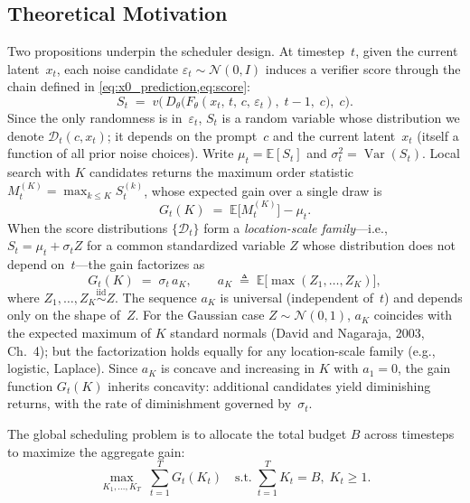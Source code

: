 \subsection{Theoretical Motivation}
\label{sec:theory}

Two propositions underpin the scheduler design.
At timestep~$t$, given the current latent~$x_t$, each noise candidate
$\varepsilon_t\sim\mathcal{N}(0,I)$ induces a verifier score through the
chain defined in \cref{eq:x0_prediction,eq:score}:
\begin{equation}
  S_t \;=\; v\!\bigl(\,D_\theta\bigl(F_\theta(x_t,\,t,\,c,\,\varepsilon_t),
  \;t\!-\!1,\;c\bigr),\;c\bigr).
  \label{eq:score_rv}
\end{equation}
Since the only randomness is in~$\varepsilon_t$, $S_t$ is a random variable
whose distribution we denote $\mathcal{D}_t(c,x_t)$; it depends on the
prompt~$c$ and the current latent~$x_t$ (itself a function of all prior
noise choices).
Write $\mu_t=\mathbb{E}[S_t]$ and $\sigma_t^2=\operatorname{Var}(S_t)$.
Local search with $K$ candidates returns the maximum order statistic
$M_t^{(K)}=\max_{k\le K}S_t^{(k)}$, whose expected gain over a single draw
is
\begin{equation}
  G_t(K) \;=\; \mathbb{E}\!\bigl[M_t^{(K)}\bigr] - \mu_t.
  \label{eq:gain}
\end{equation}
When the score distributions $\{\mathcal{D}_t\}$ form a
\emph{location-scale family}---i.e.,
$S_t = \mu_t + \sigma_t Z$ for a common standardized variable $Z$
whose distribution does not depend on~$t$---the gain factorizes as
\begin{equation}
  G_t(K) \;=\; \sigma_t\,a_K,
  \qquad
  a_K \;\triangleq\; \mathbb{E}\bigl[\max(Z_1,\dots,Z_K)\bigr],
  \label{eq:gain-factor}
\end{equation}
where $Z_1,\dots,Z_K\stackrel{\text{iid}}{\sim}Z$.
The sequence $a_K$ is universal (independent of~$t$) and depends only
on the shape of~$Z$.
For the Gaussian case $Z\sim\mathcal{N}(0,1)$, $a_K$ coincides with
the expected maximum of $K$ standard normals (David and Nagaraja, 2003,
Ch.~4); but the factorization holds equally for any location-scale
family (e.g., logistic, Laplace).
Since $a_K$ is concave and increasing in $K$ with $a_1=0$, the gain function
$G_t(K)$ inherits concavity: additional candidates yield diminishing
returns, with the rate of diminishment governed by~$\sigma_t$.

The global scheduling problem is to allocate the total budget $B$ across
timesteps to maximize the aggregate gain:
\begin{equation}
  \max_{K_1,\dots,K_T}\;\sum_{t=1}^{T}G_t(K_t)
  \quad\text{s.t.}\;\sum_{t=1}^{T}K_t=B,\;K_t\ge 1.
  \label{eq:alloc}
\end{equation}


